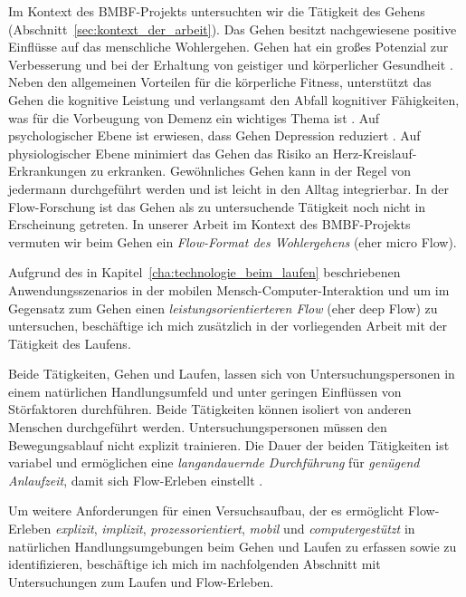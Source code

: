 

Im Kontext des \acs{BMBF}-Projekts untersuchten wir die Tätigkeit des Gehens (Abschnitt~\ref{sec:kontext_der_arbeit}). Das Gehen besitzt nachgewiesene positive Einflüsse auf das menschliche Wohlergehen. Gehen hat ein großes Potenzial zur Verbesserung und bei der Erhaltung von geistiger und körperlicher Gesundheit \citep{Lee2008, Morris1997}. Neben den allgemeinen Vorteilen für die körperliche Fitness, unterstützt das Gehen die kognitive Leistung und verlangsamt den Abfall kognitiver Fähigkeiten, was für die Vorbeugung von Demenz ein wichtiges Thema ist \citep{Weuve2004}. Auf psychologischer Ebene ist erwiesen, dass Gehen Depression reduziert \citep{Robertson2012}. Auf physiologischer Ebene minimiert das Gehen das Risiko an Herz-Kreislauf-Erkrankungen zu erkranken. Gewöhnliches Gehen kann in der Regel von jedermann durchgeführt werden und ist leicht in den Alltag integrierbar. In der Flow-Forschung ist das Gehen als zu untersuchende Tätigkeit noch nicht in Erscheinung getreten. In unserer Arbeit im Kontext des \acs{BMBF}-Projekts vermuten wir beim Gehen ein \emph{Flow-Format des Wohlergehens} (eher micro Flow). 

Aufgrund des in Kapitel~\ref{cha:technologie_beim_laufen} beschriebenen Anwendungsszenarios in der mobilen Mensch-Computer-Interaktion und um im Gegensatz zum Gehen einen \emph{leistungsorientierteren Flow} (eher deep Flow) zu untersuchen, beschäftige ich mich zusätzlich in der vorliegenden Arbeit mit der Tätigkeit des Laufens. 

Beide Tätigkeiten, Gehen und Laufen, lassen sich von Untersuchungspersonen in einem natürlichen Handlungsumfeld und unter geringen Einflüssen von Störfaktoren durchführen.  Beide Tätigkeiten können isoliert von anderen Menschen durchgeführt werden. Untersuchungspersonen müssen den Bewegungsablauf nicht explizit trainieren. Die Dauer der beiden Tätigkeiten ist variabel und ermöglichen eine \emph{langandauernde Durchführung} für \emph{genügend Anlaufzeit}, damit sich Flow-Erleben einstellt \citep[S.~109]{Henk2014}.

Um weitere Anforderungen für einen Versuchsaufbau, der es ermöglicht Flow-Erleben \emph{explizit}, \emph{implizit}, \emph{prozessorientiert}, \emph{mobil} und \emph{computergestützt} in natürlichen Handlungsumgebungen beim Gehen und Laufen zu erfassen sowie zu identifizieren, beschäftige ich mich im nachfolgenden Abschnitt mit Untersuchungen zum Laufen und Flow-Erleben. 
